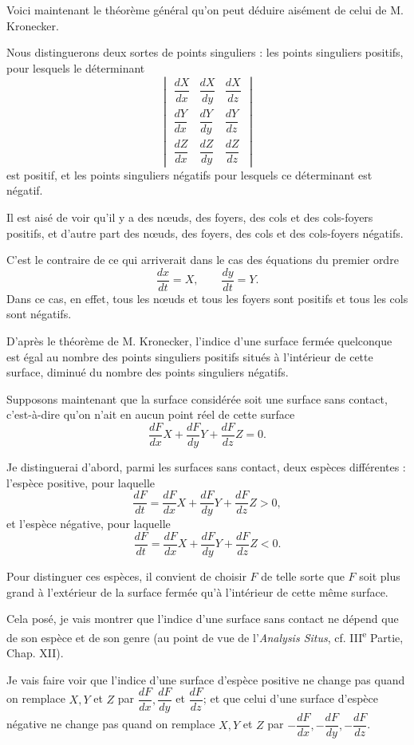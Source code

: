 \documentclass[11pt]{article}
\begin{document}
Voici maintenant le théorème général qu’on peut déduire aisément de celui de M. Kronecker.

Nous distinguerons deux sortes de points singuliers : les points singuliers positifs, pour lesquels le déterminant
\begin{equation}
\begin{vmatrix}
\dfrac{dX}{dx}&\dfrac{dX}{dy}&\dfrac{dX}{dz}\\
\dfrac{dY}{dx}&\dfrac{dY}{dy}&\dfrac{dY}{dz}\\
\dfrac{dZ}{dx}&\dfrac{dZ}{dy}&\dfrac{dZ}{dz}
\end{vmatrix}
\tag{1}
\end{equation}
est positif, et les points singuliers négatifs pour lesquels ce déterminant est négatif.

Il est aisé de voir qu’il y a des nœuds, des foyers, des cols et des cols-foyers positifs, et d’autre part des nœuds, des foyers, des cols et des cols-foyers négatifs.

C’est le contraire de ce qui arriverait dans le cas des équations du premier ordre
\[
\frac{dx}{dt}=X,
\qquad
\frac{dy}{dt}=Y.
\]
Dans ce cas, en effet, tous les nœuds et tous les foyers sont positifs et tous les cols sont négatifs.

D’après le théorème de M. Kronecker, l’indice d’une surface fermée quelconque est égal au nombre des points singuliers positifs situés à l’intérieur de cette surface, diminué du nombre des points singuliers négatifs.

Supposons maintenant que la surface considérée soit une surface sans contact, c’est-à-dire qu’on n’ait en aucun point réel de cette surface
\[
\frac{dF}{dx}X+\frac{dF}{dy}Y+\frac{dF}{dz}Z=0.
\]

Je distinguerai d’abord, parmi les surfaces sans contact, deux espèces différentes : l’espèce positive, pour laquelle
\[
\frac{dF}{dt}=\frac{dF}{dx}X+\frac{dF}{dy}Y+\frac{dF}{dz}Z>0,
\]
et l’espèce négative, pour laquelle
\[
\frac{dF}{dt}=\frac{dF}{dx}X+\frac{dF}{dy}Y+\frac{dF}{dz}Z<0.
\]

Pour distinguer ces espèces, il convient de choisir $F$ de telle sorte que $F$ soit plus grand à l’extérieur de la surface fermée qu’à l’intérieur de cette même surface.

Cela posé, je vais montrer que l’indice d’une surface sans contact ne dépend que de son espèce et de son genre (au point de vue de l’\emph{Analysis Situs}, cf. III\textsuperscript{e} Partie, Chap. XII).

Je vais faire voir que l’indice d’une surface d’espèce positive ne change pas quand on remplace $X,Y$ et $Z$ par $\dfrac{dF}{dx},\dfrac{dF}{dy}$ et $\dfrac{dF}{dz}$; et que celui d’une surface d’espèce négative ne change pas quand on remplace $X,Y$ et $Z$ par $-\dfrac{dF}{dx},-\dfrac{dF}{dy},-\dfrac{dF}{dz}$.
\end{document}
